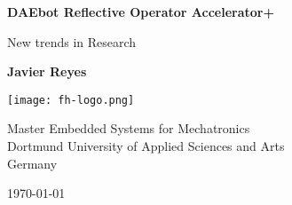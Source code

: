 \begin{titlepage}
  \begin{center}
    \vspace*{2cm}

    \Huge
    \textbf{DAEbot Reflective Operator Accelerator+}

    \vspace{1cm}

    \LARGE
    {New trends in Research}

    \vspace{3cm}

    \textbf{Javier Reyes}

    \vfill

    \vspace{2cm}

    \texttt{[image: fh-logo.png]}

    \vspace{2cm}

    \Large
    {Master Embedded Systems for Mechatronics\\
    Dortmund University of Applied Sciences and Arts\\
    Germany}

    \vspace{0.5cm}

    \large
    {\today}

  \end{center}
\end{titlepage}
